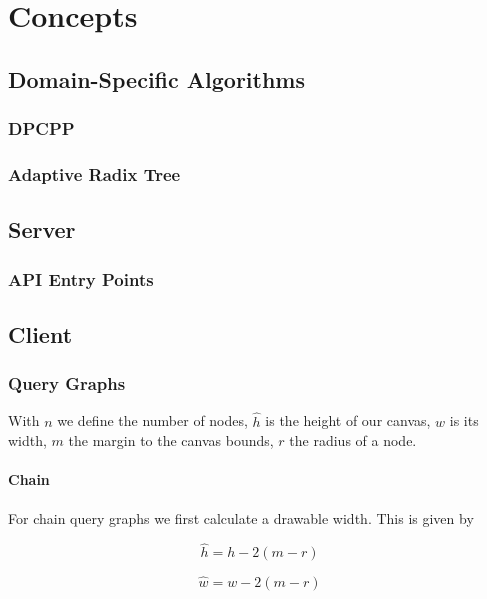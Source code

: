 \section{Concepts}

\subsection{Domain-Specific Algorithms}

\subsubsection{DPCPP}

\subsubsection{Adaptive Radix Tree}

\subsection{Server}
\subsubsection{API Entry Points}

\subsection{Client}

\subsubsection{Query Graphs}

With $n$ we define the number of nodes, $\hat{h}$ is the height of our canvas, $w$ is its width, $m$ the margin to the canvas bounds, $r$ the radius of a node.

\paragraph{Chain} For chain query graphs we first calculate a drawable width. This is given by 

\begin{equation}\label{eqn:painting-h_hat}
    \hat{h} = h - 2(m - r)    
\end{equation}

\begin{equation}\label{eqn:painting-w_hat}
    \hat{w} = w - 2(m - r)
\end{equation}

